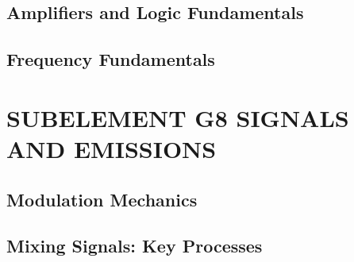 \documentclass[12pt]{book}
\begin{document}
\section{Amplifiers and Logic Fundamentals}











\section{Frequency Fundamentals}














\chapter{SUBELEMENT G8  SIGNALS AND EMISSIONS}
\section{Modulation Mechanics}














\section{Mixing Signals: Key Processes}













\end{document}
